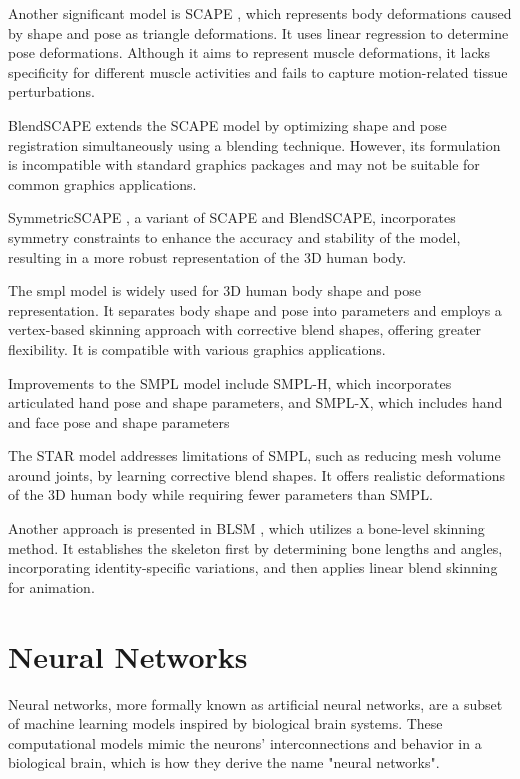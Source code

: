 Another significant model is SCAPE \cite{scape}, which represents body
deformations caused by shape and pose as triangle deformations. It uses linear
regression to determine pose deformations. Although it aims to represent muscle
deformations, it lacks specificity for different muscle activities and fails to
capture motion-related tissue perturbations.

BlendSCAPE \cite{blendscape} extends the SCAPE model by optimizing shape and
pose registration simultaneously using a blending technique. However, its
formulation is incompatible with standard graphics packages and may not be
suitable for common graphics applications.

SymmetricSCAPE \cite{CHEN201952}, a variant of SCAPE and BlendSCAPE,
incorporates symmetry constraints to enhance the accuracy and stability of the
model, resulting in a more robust representation of the 3D human body.

The \gls{smpl} \cite{SMPL:2015} model is widely used for 3D human body shape
and pose representation. It separates body shape and pose into parameters and
employs a vertex-based skinning approach with corrective blend shapes, offering
greater flexibility. It is compatible with various graphics applications.

Improvements to the SMPL model include SMPL-H, which incorporates articulated
hand pose and shape parameters, and SMPL-X, which includes hand and face pose
and shape parameters \cite{SMPL-X:2019}

The STAR model \cite{STAR:2020} addresses limitations of SMPL, such as reducing
mesh volume around joints, by learning corrective blend shapes. It offers
realistic deformations of the 3D human body while requiring fewer parameters
than SMPL.

Another approach is presented in BLSM \cite{doi:10.1007/978-3-030-58558-7_1},
which utilizes a bone-level skinning method. It establishes the skeleton first
by determining bone lengths and angles, incorporating identity-specific
variations, and then applies linear blend skinning for animation.

\section{Neural Networks}

Neural networks, more formally known as artificial neural networks, are a
subset of machine learning models inspired by biological brain systems. These
computational models mimic the neurons' interconnections and behavior in a
biological brain, which is how they derive the name "neural networks".

